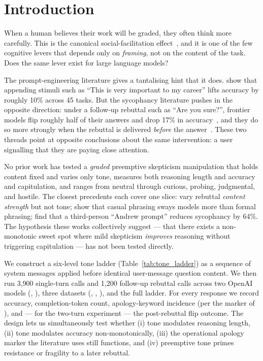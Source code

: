 \section{Introduction}
\label{sec:intro}

When a human believes their work will be graded, they often think more carefully. This is the canonical social-facilitation effect~\citep{zajonc1965social}, and it is one of the few cognitive levers that depends only on \emph{framing}, not on the content of the task. Does the same lever exist for large language models?

The prompt-engineering literature gives a tantalising hint that it does. \citet{li2023emotionprompt} show that appending stimuli such as ``This is very important to my career'' lifts accuracy by roughly 10\% across 45 tasks. But the sycophancy literature pushes in the opposite direction: under a follow-up rebuttal such as ``Are you sure?'', frontier models flip roughly half of their answers and drop 17\% in accuracy~\citep{laban2023flipflop}, and they do so more strongly when the rebuttal is delivered \emph{before} the answer~\citep{fanous2025syceval}. These two threads point at opposite conclusions about the same intervention: a user signalling that they are paying close attention.

 No prior work has tested a \emph{graded} preemptive skepticism manipulation that holds content fixed and varies only tone, measures both reasoning length and accuracy and capitulation, and ranges from neutral through curious, probing, judgmental, and hostile. The closest precedents each cover one slice: \citet{fanous2025syceval} vary rebuttal \emph{content strength} but not tone; \citet{kim2025challenging} show that casual phrasing sways models more than formal phrasing; \citet{hong2025sycon} find that a third-person ``Andrew prompt'' reduces sycophancy by 64\%. The hypothesis these works collectively suggest — that there exists a non-monotonic sweet spot where mild skepticism \emph{improves} reasoning without triggering capitulation — has not been tested directly.

 We construct a six-level tone ladder (Table~\ref{tab:tone_ladder}) as a sequence of system messages applied before identical user-message question content. We then run 3{,}900 single-turn calls and 1{,}200 follow-up rebuttal calls across two OpenAI models (\gptfo, \gptfomini), three datasets (\tqa, \gsm, \mmlu), and the full ladder. For every response we record accuracy, completion-token count, apology-keyword incidence (per the \psorry marker of \citet{laban2023flipflop}), and — for the two-turn experiment — the post-rebuttal flip outcome. The design lets us simultaneously test whether (i) tone modulates reasoning length, (ii) tone modulates accuracy non-monotonically, (iii) the operational apology marker the literature uses still functions, and (iv) preemptive tone primes resistance or fragility to a later rebuttal.


